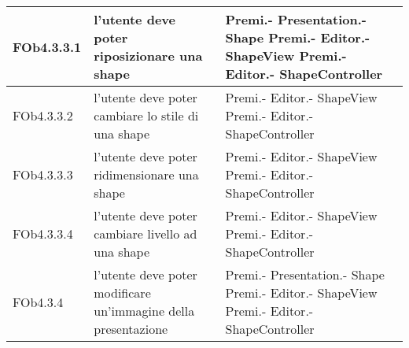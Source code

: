 \begin{longtable}{|l|p{5cm}|p{7cm}|}
\hline
FOb4.3.3.1 & l'utente deve poter riposizionare una shape & Premi.- \linebreak Presentation.- \linebreak Shape \linebreak Premi.- \linebreak Editor.- \linebreak ShapeView \linebreak Premi.- \linebreak Editor.- \linebreak ShapeController \linebreak \\
\hline
FOb4.3.3.2 & l'utente deve poter cambiare lo stile di una shape & Premi.- \linebreak Editor.- \linebreak ShapeView \linebreak Premi.- \linebreak Editor.- \linebreak ShapeController \linebreak \\
\hline
FOb4.3.3.3 & l'utente deve poter ridimensionare una shape & Premi.- \linebreak Editor.- \linebreak ShapeView \linebreak Premi.- \linebreak Editor.- \linebreak ShapeController \linebreak \\
\hline
FOb4.3.3.4 & l'utente deve poter cambiare livello ad una shape & Premi.- \linebreak Editor.- \linebreak ShapeView \linebreak Premi.- \linebreak Editor.- \linebreak ShapeController \linebreak \\
\hline
FOb4.3.4 & l'utente deve poter modificare un'immagine della presentazione & Premi.- \linebreak Presentation.- \linebreak Shape \linebreak Premi.- \linebreak Editor.- \linebreak ShapeView \linebreak Premi.- \linebreak Editor.- \linebreak ShapeController \linebreak \\

\end{longtable}
